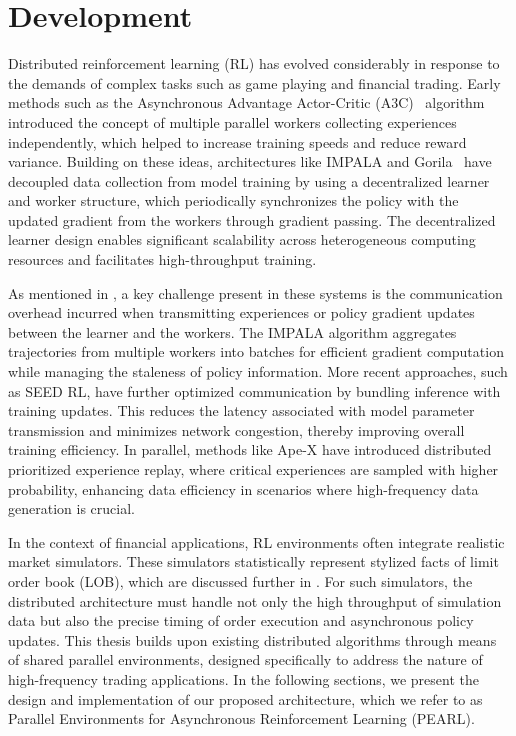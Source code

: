 \chapter{Development}
\label{ch:development}

Distributed reinforcement learning (RL) has evolved considerably in response to the demands of complex tasks such as game playing and financial trading.
Early methods such as the Asynchronous Advantage Actor-Critic (A3C)~\citep{Mnih2016}
algorithm introduced the concept of multiple parallel workers collecting experiences independently,
which helped to increase training speeds and reduce reward variance.
Building on these ideas, architectures like IMPALA and Gorila~\citep{Espeholt2018,Nair2015} have decoupled data collection from model training by using
a decentralized learner and worker structure, which periodically synchronizes the policy with the updated gradient
from the workers through gradient passing.
The decentralized learner design enables significant scalability across heterogeneous computing resources and facilitates high-throughput training.

As mentioned in , a key challenge present in these systems is the communication overhead incurred when transmitting experiences or
policy gradient updates between the learner and the workers.
The IMPALA algorithm aggregates trajectories from multiple workers into
batches for efficient gradient computation while managing the staleness of policy information.
More recent approaches, such as SEED RL\citep{Espeholt2020}, have further optimized communication by bundling inference with training updates.
This reduces the latency associated with model parameter transmission and minimizes network congestion, thereby improving overall training efficiency.
In parallel, methods like Ape-X\citep{Horgan2018} have introduced distributed prioritized experience replay, where critical experiences are sampled with higher probability,
enhancing data efficiency in scenarios where high-frequency data generation is crucial.

In the context of financial applications, RL environments often integrate realistic market simulators.
These simulators statistically represent stylized facts of limit order book (LOB), which are discussed
further in .
For such simulators, the distributed architecture must handle not only the high throughput of simulation data but also the
precise timing of order execution and asynchronous policy updates.
This thesis builds upon existing distributed algorithms through means of shared parallel environments,
designed specifically to address the nature of high-frequency trading applications.
In the following sections, we present the design and implementation of our proposed architecture,
which we refer to as Parallel Environments for Asynchronous Reinforcement Learning (PEARL).

